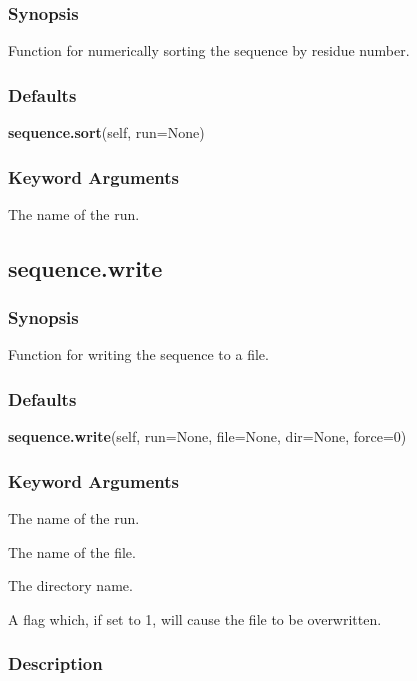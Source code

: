\subsubsection{Synopsis}

Function for numerically sorting the sequence by residue number.

\subsubsection{Defaults}

\textsf{\textbf{sequence.sort}(self, run=None)}


\subsubsection{Keyword Arguments}


  The name of the run.


\newpage

\subsection{sequence.write}


\subsubsection{Synopsis}

Function for writing the sequence to a file.

\subsubsection{Defaults}

\textsf{\textbf{sequence.write}(self, run=None, file=None, dir=None, force=0)}


\subsubsection{Keyword Arguments}


  The name of the run.

  The name of the file.

  The directory name.

  A flag which, if set to 1, will cause the file to be overwritten.

\subsubsection{Description}


